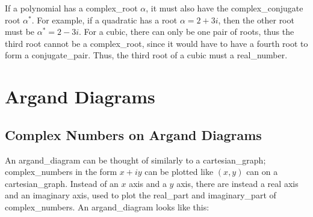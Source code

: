 \documentclass{book}
\DeclareMathOperator{\real}{Re}
\DeclareMathOperator{\imag}{Im}
\begin{document}
            If a \gls{polynomial} has a \gls{complex_root} $\alpha$, it must also have the \gls{complex_conjugate} \gls{root} $\alpha^*$.
            For example, if a \gls{quadratic} has a \gls{root} $\alpha=2+3i$, then the other \gls{root} must be $\alpha^*=2-3i$.
            For a \gls{cubic}, there can only be one pair of \glspl{root}, thus the third \gls{root} cannot be a \gls{complex_root}, since it would have to have a fourth \gls{root} to form a \gls{conjugate_pair}.
            Thus, the third \gls{root} of a \gls{cubic} must a \gls{real_number}.
        \newpage

    \section{Argand Diagrams} \label{argand_diagrams}
        \subsection{Complex Numbers on Argand Diagrams}
            An \gls{argand_diagram} can be thought of similarly to a \gls{cartesian_graph}; \glspl{complex_number} in the form $x+iy$ can be plotted like $(x, y)$ can on a \gls{cartesian_graph}.
            Instead of an $x$ axis and a $y$ axis, there are instead a real axis and an imaginary axis, used to plot the \gls{real_part} and \gls{imaginary_part} of \glspl{complex_number}.
            An \gls{argand_diagram} looks like this:

            \begin{center}
            \end{center}
\end{document}

